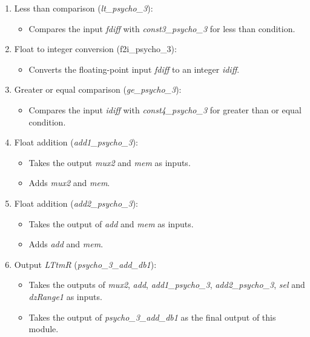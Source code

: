 \begin{enumerate}
\item Less than comparison (\textit{lt\_psycho\_3}):
\begin{itemize}
\item Compares the input \textit{fdiff} with \textit{const3\_psycho\_3} for less than condition.
\end{itemize}

\item Float to integer conversion (f2i\_psycho\_3):
\begin{itemize}
\item Converts the floating-point input \textit{fdiff} to an integer \textit{idiff}.
\end{itemize}

\item Greater or equal comparison (\textit{ge\_psycho\_3}):
\begin{itemize}
\item Compares the input \textit{idiff} with \textit{const4\_psycho\_3} for greater than or equal condition.
\end{itemize}

\item Float addition (\textit{add1\_psycho\_3}):
\begin{itemize}
\item Takes the output \textit{mux2} and \textit{mem} as inputs.
\item Adds \textit{mux2} and \textit{mem}.
\end{itemize}

\item Float addition (\textit{add2\_psycho\_3}):
\begin{itemize}
\item Takes the output of \textit{add} and \textit{mem} as inputs.
\item Adds \textit{add} and \textit{mem}.
\end{itemize}

\item Output \textit{LTtmR} (\textit{psycho\_3\_add\_db1}):
\begin{itemize}
\item Takes the outputs of \textit{mux2}, \textit{add}, \textit{add1\_psycho\_3}, \textit{add2\_psycho\_3}, \textit{sel} and \textit{dzRange1} as inputs.
\item Takes the output of \textit{psycho\_3\_add\_db1} as the final output of this module. 
\end{itemize}

\end{enumerate}


